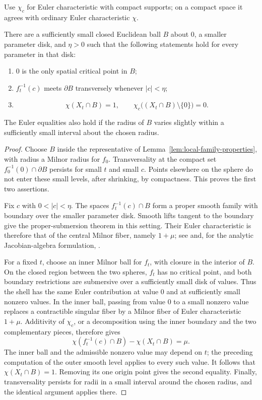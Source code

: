 Use $\chi_c$ for Euler characteristic with compact supports; on a compact
space it agrees with ordinary Euler characteristic $\chi$.

\begin{lemma}
\label{lem:fixed-ball-euler}
There are a sufficiently small closed Euclidean ball $B$ about $0$, a
smaller parameter disk, and $\eta>0$ such that the following statements
hold for every parameter in that disk:
\begin{enumerate}
\item $0$ is the only spatial critical point in $B$;
\item $f_t^{-1}(c)$ meets $\partial B$ transversely whenever $|c|<\eta$;
\item
\[
 \chi(X_t\cap B)=1,
 \qquad
 \chi_c\bigl((X_t\cap B)\setminus\{0\}\bigr)=0.
\]
\end{enumerate}
The Euler equalities also hold if the radius of $B$ varies slightly
within a sufficiently small interval about the chosen radius.
\end{lemma}

\begin{proof}
Choose $B$ inside the representative of
Lemma~\ref{lem:local-family-properties}, with radius a Milnor radius for
$f_0$.  Transversality at the compact set
$f_0^{-1}(0)\cap\partial B$ persists for small $t$ and small $c$.
Points elsewhere on the sphere do not enter these small levels, after
shrinking, by compactness.  This proves the first two assertions.

Fix $c$ with $0<|c|<\eta$.  The spaces $f_t^{-1}(c)\cap B$ form a proper
smooth family with boundary over the smaller parameter disk.  Smooth
lifts tangent to the boundary give the proper-submersion theorem in
this setting.  Their Euler characteristic is therefore that of the
central Milnor fiber, namely $1+\mu$; see
\cite[Theorems~6.5 and~7.2]{Milnor1968} and, for the analytic
Jacobian-algebra formulation, \cite[Section~1, Theorem~1.5]{LeRamanujam1976}.

For a fixed $t$, choose an inner Milnor ball for $f_t$, with closure in
the interior of $B$.  On the closed region between the two spheres,
$f_t$ has no critical point, and both boundary restrictions are
submersive over a sufficiently small disk of values.  Thus the shell
has the same Euler contribution at value $0$ and at sufficiently small
nonzero values.  In the inner ball, passing from value $0$ to a small
nonzero value replaces a contractible singular fiber by a Milnor fiber
of Euler characteristic $1+\mu$.  Additivity of $\chi_c$, or a
decomposition using the inner boundary and the two complementary
pieces, therefore gives
\[
 \chi(f_t^{-1}(c)\cap B)-\chi(X_t\cap B)=\mu.
\]
The inner ball and the admissible nonzero value may depend on $t$;
the preceding computation of the outer smooth level applies to every
such value.  It follows that $\chi(X_t\cap B)=1$.  Removing its one
origin point gives the second equality.  Finally, transversality
persists for radii in a small interval around the chosen radius, and
the identical argument applies there.
\end{proof}

